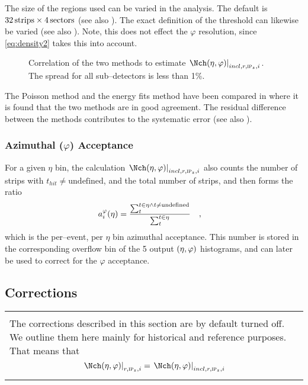 The size of the regions used can be varied in the analysis.  The
default is $\unit[32]{strips}\times\unit[4]{sectors}$ (see also
).  The exact definition of the threshold can
likewise be varied (see also ).   Note, this does not
effect the $\varphi$ resolution, since \eqref{eq:density2} takes this
into account. 

\begin{figure}[htbp]
  \centering
  \caption{Correlation of the two methods to estimate
    $\dndetadphi[incl,r,\subIPz,i]$.  The spread for all sub--detectors is
    less than 1\%.}
  \label{fig:density:corr}
\end{figure}


The Poisson method and the energy fits method have been compared in
\cite{hhd:2009} where it is found that the two methods are in good
agreement. The residual difference between the methods contributes to
the systematic error (see also ).

\subsubsection{Azimuthal ($\varphi$) Acceptance} 

For a given $\eta$ bin, the calculation
$\dndetadphi[incl,r,\subIPz,i]$ also counts the number of strips with
$t_{hit}\neq\text{undefined}$, and the total number of strips, and then
forms the ratio
\begin{align}
  \label{eq:overflow}
  a_i^{\varphi}(\eta) &= \frac{\sum_t^{t\in\eta \wedge
      t\neq\text{undefined}}}{\sum_t^{t\in\eta}} \quad,
\end{align}
which is the per--event, per $\eta$ bin azimuthal acceptance.  This
number is stored in the corresponding overflow bin of the 5 output
$(\eta,\varphi)$ histograms, and can later be used to correct for the
$\varphi$ acceptance.

\subsection{Corrections}
\label{sec:sub:corrector}

\begin{center}
  \begin{tabular}{|p{.9\linewidth}|}
    \arrayrulecolor{alicepurple}
    \hline
    \cellcolor{alicered!20}\\
    \cellcolor{alicered!20}
    The corrections described in this section are by default turned off.
    We outline them here mainly for historical and reference
    purposes. That means that 
    \begin{equation}
      \dndetadphi[r,\subIPz,i] = \dndetadphi[incl,r,\subIPz,i]
    \end{equation}\\
    \hline
  \end{tabular}
\end{center}

